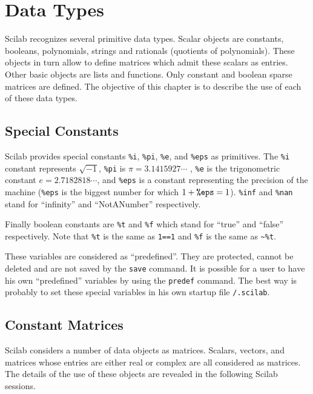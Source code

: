 \chapter{Data Types}
\label{ch2}

	Scilab recognizes several primitive data types.
 Scalar objects are constants, booleans, polynomials, strings and 
rationals (quotients of polynomials). These objects in turn allow to 
define matrices which admit these scalars as entries.
Other basic objects are lists and functions. Only constant and boolean
sparse matrices are defined.
%
The objective of this chapter is to describe the use of each of 
these data types.

\section{Special Constants}
\label{s2.1}

	Scilab provides special constants {\tt \%i}, {\tt \%pi},
{\tt \%e}, and {\tt \%eps} as primitives.  The {\tt \%i} constant
represents $\sqrt{-1}$, {\tt \%pi} is $\pi=3.1415927\cdots$ , {\tt \%e}
is the trigonometric constant $e=2.7182818\cdots$, and {\tt \%eps}
is a constant representing the precision of the machine ({\tt \%eps}
is the biggest number for which $1+\mbox{\tt \%eps}=1$). {\tt \%inf}
and {\tt \%nan} stand for ``infinity'' and ``NotANumber'' respectively.

Finally boolean constants are {\tt \%t} and {\tt \%f} which stand for
``true'' and ``false'' respectively. Note that {\tt \%t} is the
same as {\tt 1==1} and {\tt \%f} is the same as {\verb!~%t!}.

These variables are considered as ``predefined''. They are protected, cannot 
be deleted and are not saved by the {\tt save} command. It is possible
for a user to have his own ``predefined'' variables by using the
{\tt predef} command. The best way is probably to set these special variables
in his own startup file {\tt <home dir>/.scilab}.

\section{Constant Matrices}
\label{s2.2}

	Scilab considers a number of data objects as matrices.  
Scalars, vectors, and matrices whose entries are either real or complex
are all considered as matrices.  The details of the use
of these objects are revealed in the following Scilab sessions.

